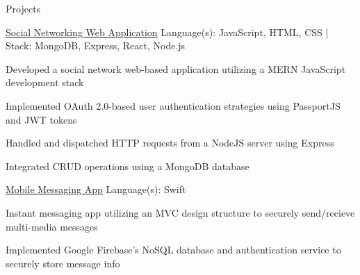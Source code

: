 \documentclass{resume} %
\newcommand{\ExternalLink}{%
    \tikz[x=1.2ex, y=1.2ex, baseline=-0.05ex]{%
        \begin{scope}[x=1ex, y=1ex]
            \clip (-0.1,-0.1) 
                --++ (-0, 1.2) 
                --++ (0.6, 0) 
                --++ (0, -0.6) 
                --++ (0.6, 0) 
                --++ (0, -1);
            \path[draw, 
                line width = 0.5, 
                rounded corners=0.5] 
                (0,0) rectangle (1,1);
        \end{scope}
        \path[draw, line width = 0.5] (0.5, 0.5) 
            -- (1, 1);
        \path[draw, line width = 0.5] (0.6, 1) 
            -- (1, 1) -- (1, 0.6);
        }
    }
\begin{document}
\begin{rSection}{Projects}
  \begin{rWorkSection}{\href{https://github.com/tharseken/Social-Networking-Web-Application}{Social Networking Web Application} }
                     {}
                     {\textnormal{Language(s):} JavaScript, HTML, CSS \textnormal{| Stack:} MongoDB, Express, React, Node.js}
                     {}
    \item Developed a social network web-based application utilizing a MERN JavaScript development stack
    \item Implemented OAuth 2.0-based user authentication strategies using PassportJS and JWT tokens
    \item Handled and dispatched HTTP requests from a NodeJS server using Express
    \item Integrated CRUD operations using a MongoDB database
  \end{rWorkSection}
  
  \vspace{-0.1em}

  \begin{rWorkSection}{\href{https://github.com/tharseken/Mobile-Messaging-Application}{Mobile Messaging App}}
                      {}
                      {\textnormal{Language(s):} Swift}
                      {}
    \item Instant messaging app utilizing an MVC design structure to securely send/recieve multi-media messages
    \item Implemented Google Firebase's NoSQL database and authentication service to securely store message info
  \end{rWorkSection}

  \vspace{-0.1em}



\end{rSection}
\end{document}
